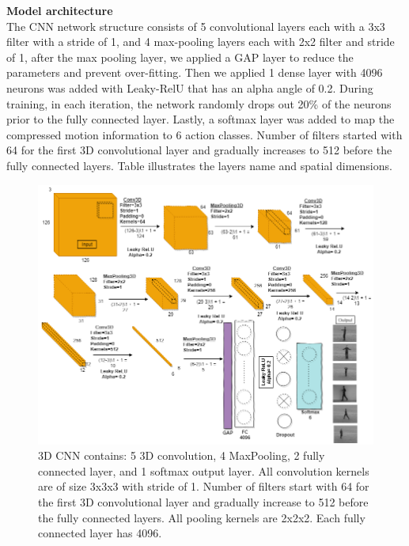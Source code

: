 \documentclass{vldb}
\begin{document}
\textbf{Model architecture}\\

The CNN network structure consists of 5 convolutional layers each with a 3x3 filter with a stride of 1, and 4 max-pooling layers each with 2x2 filter and stride of 1, after the max pooling layer, we applied a GAP layer to reduce the parameters and prevent over-fitting. Then we applied 1 dense layer with 4096 neurons was added with Leaky-RelU that has an alpha angle of 0.2. During training, in each iteration, the network randomly drops out 20\% of the neurons prior to the fully connected layer. Lastly, a softmax layer was added to map the compressed motion information to 6 action classes. Number of filters started with 64 for the first
3D convolutional layer and gradually increases to 512 before the fully connected layers. Table illustrates the layers name and spatial dimensions.  
\begin{figure}[ht]
\centering
\includegraphics[width=1.5\columnwidth]{photo/nn2}
\caption{3D CNN contains: 5 3D convolution, 4 MaxPooling, 2 fully connected layer, and 1 softmax output layer. All convolution kernels are of size 3x3x3 with stride of 1. Number of filters start with 64 for the first 3D convolutional layer and gradually increase to 512 before the fully connected layers. All pooling kernels are 2x2x2. Each fully connected layer has 4096.}
\label{fig:modelarchitecturecnn}
\end{figure}
\end{document}
